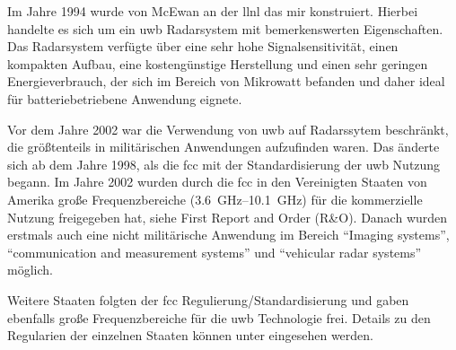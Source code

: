 

Im Jahre 1994 wurde von McEwan an der \gls{llnl} das \gls{mir} konstruiert. Hierbei handelte es sich um ein \gls{uwb} Radarsystem mit bemerkenswerten Eigenschaften. Das Radarsystem verfügte über eine sehr hohe Signalsensitivität, einen kompakten Aufbau, eine kostengünstige Herstellung und einen sehr geringen Energieverbrauch, der sich im Bereich von Mikrowatt befanden und daher ideal für batteriebetriebene Anwendung eignete. \cite{barrett2001technical}


Vor dem Jahre 2002 war die Verwendung von \gls{uwb} auf Radarssytem beschränkt, die größtenteils in militärischen Anwendungen aufzufinden waren. \cite{yang2004uwbcom} Das änderte sich ab dem Jahre 1998, als die \gls{fcc} mit der Standardisierung der \gls{uwb} Nutzung begann. Im Jahre 2002 wurden durch die \gls{fcc} in den Vereinigten Staaten von Amerika große Frequenzbereiche (\SIrange{3.6}{10.1}{\GHz}) für die kommerzielle Nutzung freigegeben hat, siehe First Report and Order (R\&O). Danach wurden erstmals auch eine nicht militärische Anwendung im Bereich ``Imaging systems'', ``communication and measurement systems'' und ``vehicular radar systems'' möglich. \cite{yang2004uwbcom}


Weitere Staaten folgten der \gls{fcc} Regulierung/Standardisierung und gaben ebenfalls große Frequenzbereiche für die \gls{uwb} Technologie frei. Details zu den Regularien der einzelnen Staaten können unter \cite{decawave2015uwbreg} eingesehen werden.

